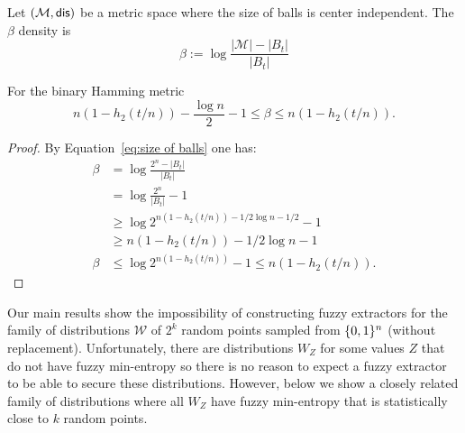 \begin{definition}
Let $(\mathcal{M}, \mathsf{dis})$ be a metric space where the size of balls is center independent.  The $\beta$ density is
\[
\beta := \log{\frac{|\mathcal{M}|- |B_t|}{|B_t|}} 
\]
\end{definition}
\begin{claim} 
For the binary Hamming metric 
\[
n(1-h_2(t/n))-\frac{\log{n}}{2}-1 \le \beta \le n(1-h_2(t/n)).
\]

\end{claim}

\begin{proof}
By Equation~\ref{eq:size of balls} one has: 
\begin{align*}
\beta &= \log{\frac{2^n - |B_t|}{|B_t|}} \\&= \log{\frac{2^n}{|B_t|} -1} \\&\ge \log{2^{n(1-h_2(t/n)) - 1/2 \log{n}-1/2} -1} \\&\ge n(1-h_2(t/n)) - 1/2\log{n}-1\\
\beta&\le \log{2^{n(1-h_2(t/n))} -1} \le n(1-h_2(t/n)).
\end{align*}
\end{proof}


Our main results show the impossibility of constructing fuzzy extractors for the family of distributions $\mathcal{W}$ of $2^k$ random points sampled from $\{0, 1\}^n$ (without replacement).  Unfortunately, there are distributions $W_Z$ for some values $Z$ that do not have fuzzy min-entropy so there is no reason to expect a fuzzy extractor to be able to secure these distributions.  However, below we show a closely related family of distributions where all $W_Z$ have fuzzy min-entropy that is statistically close to $k$ random points.




